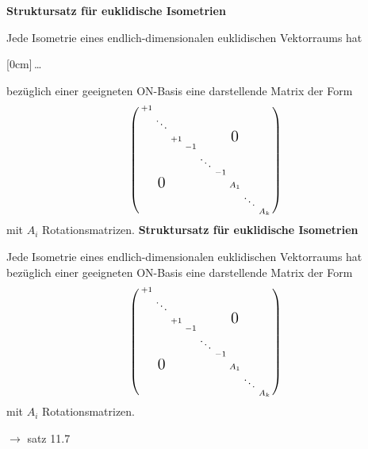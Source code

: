 \documentclass[11pt]{article}
\renewcommand{\cite}[1]{\par\bigskip\hfill{\color{gray}\tiny\(\to\) #1}}
\newcommand{\hide}[1]{\parbox{0cm}{\raisebox{-7pt}[0cm]{\dots}}\color{white}#1\color{black}}
\let\olddots\dots
\renewcommand{\dots}{\,\olddots\,}
\newenvironment{field}{}{\newpage}
\newif\ifnote
\newenvironment{note}{\notetrue}{\notefalse}
\begin{document}
\begin{note}
    \begin{field}
        \textbf{Struktursatz für euklidische Isometrien}

        Jede Isometrie eines endlich-dimensionalen euklidischen Vektorraums hat \hide{bezüglich einer geeigneten ON-Basis} eine darstellende Matrix der Form
        \[\left(\begin{smallmatrix}
            +1 \\
              & \ddots \\
              &        & +1 &  &       &  &     \mbox{\Large 0}\\
              &        &    &-1\\
              &        &    &  &\ddots\\
              &        &    &  &       &-1\\
              &\mbox{\Large 0}&    &  &       &  & A_1\\
              &        &    &  &       &  &     &\ddots\\
              &        &    &  &       &  &     &       & A_k\\
        \end{smallmatrix}\right)\]
        mit \(A_i\) Rotationsmatrizen.
    \end{field}
    \begin{field}
        \textbf{Struktursatz für euklidische Isometrien}

        Jede Isometrie eines endlich-dimensionalen euklidischen Vektorraums hat bezüglich einer geeigneten ON-Basis eine darstellende Matrix der Form
        \[\left(\begin{smallmatrix}
            +1 \\
              & \ddots \\
              &        & +1 &  &       &  &     \mbox{\Large 0}\\
              &        &    &-1\\
              &        &    &  &\ddots\\
              &        &    &  &       &-1\\
              &\mbox{\Large 0}&    &  &       &  & A_1\\
              &        &    &  &       &  &     &\ddots\\
              &        &    &  &       &  &     &       & A_k\\
        \end{smallmatrix}\right)\]
        mit \(A_i\) Rotationsmatrizen.
        \cite{satz 11.7}
    \end{field}


\end{note}
\end{document}
